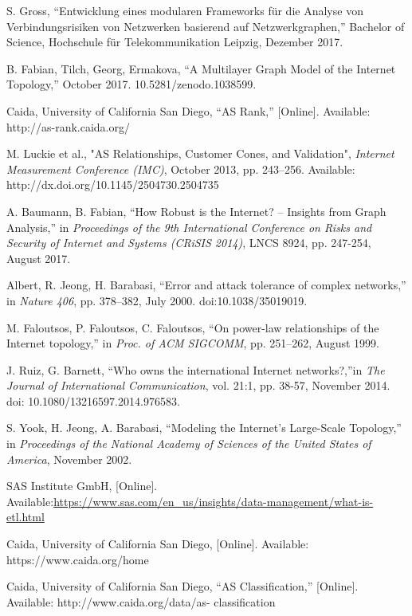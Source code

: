 \documentclass[conference, 11pt]{IEEEtran}
\begin{document}
\begin{thebibliography}{00}
S. Gross, ``Entwicklung eines modularen Frameworks für die Analyse von Verbindungsrisiken von Netzwerken basierend auf Netzwerkgraphen,'' Bachelor of Science, Hochschule für Telekommunikation Leipzig, Dezember 2017. %

B. Fabian, Tilch, Georg, Ermakova, ``A Multilayer Graph Model of the Internet Topology,'' October 2017. 10.5281/zenodo.1038599. %

Caida, University of California San Diego, ``AS Rank,'' [Online].  Available: http://as-rank.caida.org/ %

M. Luckie et al., "AS Relationships, Customer Cones, and Validation", \textit{Internet Measurement Conference (IMC)}, October 2013, pp. 243--256. Available: http://dx.doi.org/10.1145/2504730.2504735 %


A. Baumann, B. Fabian, “How Robust is the Internet? – Insights
from Graph Analysis,” in \textit{Proceedings of the 9th International
Conference on Risks and Security of Internet and Systems (CRiSIS
2014)}, LNCS 8924, pp. 247-254, August 2017. %

Albert, R. Jeong, H. Barabasi, ``Error and attack tolerance of complex networks,'' in \textit{Nature 406}, pp. 378–382, July 2000. doi:10.1038/35019019. %

M. Faloutsos, P. Faloutsos, C. Faloutsos, “On power-law relationships of the Internet topology,”  in \textit{Proc. of ACM SIGCOMM}, pp. 251–262, August 1999. %

J. Ruiz, G. Barnett, ``Who owns the international Internet networks?,''in \textit{The Journal of International
Communication}, vol. 21:1, pp. 38-57, November 2014. doi:
10.1080/13216597.2014.976583. %

S. Yook, H. Jeong, A. Barabasi, ``Modeling the Internet's Large-Scale Topology,'' in \textit{Proceedings of the National Academy of Sciences of the United States of America}, November 2002. %

SAS Institute GmbH, [Online]. Available:\url{https://www.sas.com/en_us/insights/data-management/what-is-etl.html} %

Caida, University of California San Diego, [Online]. Available: https://www.caida.org/home %

Caida, University of California San Diego, ``AS Classification,'' [Online]. Available: http://www.caida.org/data/as-
classification %


\end{thebibliography}
\end{document}
